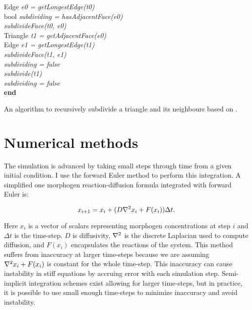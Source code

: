 \begin{algorithm}[!ht]
  {
   Edge \textit{e0 = getLongestEdge(t0)}\\
   bool \textit{subdividing = hasAdjacentFace(e0)}\\
   \textit{subdivideFace(t0, e0)}\\
   {
    {
      Triangle \textit{t1 = getAdjacentFace(e0)}\\
      Edge \textit{e1 = getLongestEdge(t1)}\\
      {
       \textit{subdivideFace(t1, e1)}\\
       \textit{subdividing = false}\\
      }{
        \textit{subdivide(t1)}\\   
      }
    }{
     \textit{subdividing = false}\\
    }
   }
  }
  \textbf{end}
  \caption{An algorithm to recursively subdivide a triangle and its neighbours based on \citep{RIVARA1998}.}
  \label{alg:subdivisionAlgorithm}
\end{algorithm}

\section{Numerical methods}
The simulation is advanced by taking small steps through time from a given initial condition. I use the forward Euler method \citep{solomon2015numerical} to perform this integration. A simplified one morphogen reaction-diffusion formula integrated with forward Euler is:

\[
	x_{i+1} = x_{i} + (D\nabla^2{}x_i + F(x_i))\Delta t. \\
\] 

Here $x_i$ is a vector of scalars representing morphogen concentrations at step $i$ and $\Delta t$ is the time-step. $D$ is diffusivity, $\nabla^2{}$ is the discrete Laplacian used to compute diffusion, and $F(x_i)$ encapsulates the reactions of the system. This method suffers from inaccuracy at larger time-steps because we are assuming $\nabla^2{}x_i + F(x_i)$ is constant for the whole time-step. This inaccuracy can cause instability in stiff equations by accruing error with each simulation step. Semi-implicit integration schemes exist \citep{Nie2006} allowing for larger time-steps, but in practice, it is possible to use small enough time-steps to minimize inaccuracy and avoid instability. 